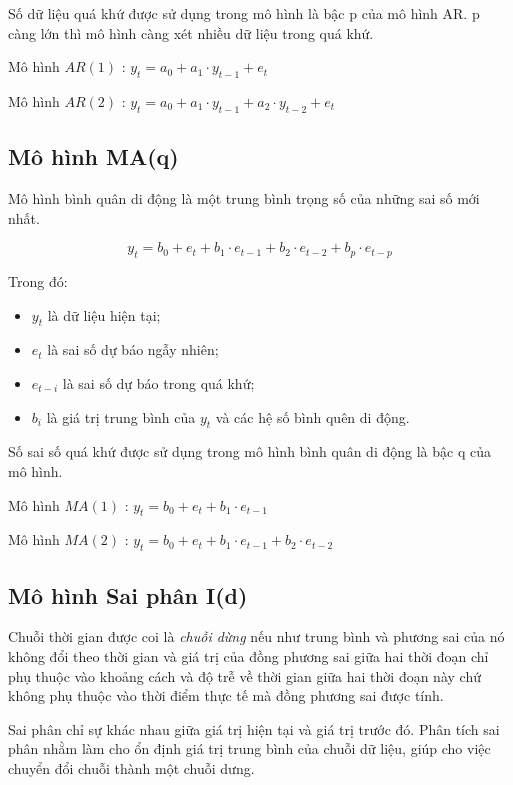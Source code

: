\documentclass[12pt]{article}
\begin{document}
    Số dữ liệu quá khứ được sử dụng trong mô hình là bậc p của mô hình AR. p càng lớn thì mô hình càng xét nhiều dữ liệu trong quá khứ.
    
    Mô hình $AR(1)$ : $y_t = a_0 + a_1 \cdot y_{t-1} + e_t$
    
    Mô hình $AR(2)$ : $y_t = a_0 + a_1 \cdot y_{t-1} + a_2 \cdot y_{t-2} + e_t$

    \subsection{Mô hình MA(q)}
    Mô hình bình quân di động là một trung bình trọng số của những sai số mới nhất.
    
    $$
    y_t = b_0 + e_t + b_1 \cdot e_{t-1} + b_2 \cdot e_{t-2} + b_p \cdot e_{t-p}
    $$
    
    Trong đó:
    \begin{itemize}
        \item $y_t$ là dữ liệu hiện tại;
        \item $e_t$ là sai số dự báo ngẫy nhiên;
        \item $e_{t-i}$ là sai số dự báo trong quá khứ;
        \item $b_i$ là giá trị trung bình của $y_t$ và các hệ số bình quên di động.
    \end{itemize}
    
    Số sai số quá khứ được sử dụng trong mô hình bình quân di động là bậc q của mô hình.
    
    Mô hình $MA(1)$ : $y_t = b_0 + e_t + b_1 \cdot e_{t-1}$
    
    Mô hình $MA(2)$ : $y_t = b_0 + e_t + b_1 \cdot e_{t-1} + b_2 \cdot e_{t-2}$
    
    \subsection{Mô hình Sai phân I(d)}
    Chuỗi thời gian được coi là \textit{chuỗi dừng} nếu như trung bình và phương sai của nó không đổi theo thời gian và giá trị của đồng phương sai giữa hai thời đoạn chỉ phụ thuộc vào khoảng cách và độ trễ về thời gian giữa hai thời đoạn này chứ không phụ thuộc vào thời điểm thực tế mà đồng phương sai được tính.

    Sai phân chỉ sự khác nhau giữa giá trị hiện tại và giá trị trước đó. Phân tích sai phân nhằm làm cho ổn định giá trị trung bình của chuỗi dữ liệu, giúp cho việc chuyển đổi chuỗi thành một chuỗi dưng.
    
\end{document}
